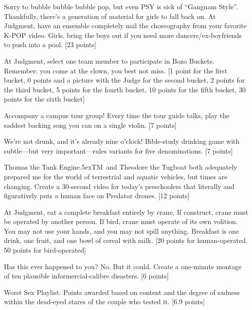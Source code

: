 \documentclass{book}
\def\tm{\raise.5ex\hbox{\scriptsize TM}}
\begin{document}
\begin{list}{}{}

\item Sorry to bubble bubble bubble pop, but even PSY is sick of ``Gangnam Style''. Thankfully, there's a generation of material for girls to fall back on. At Judgment, have an ensemble completely nail the choreography from your favorite K-POP video. Girls, bring the boys out if you need more dancers/ex-boyfriends to push into a pool. [23 points]

\item At Judgment, select one team member to participate in Bozo Buckets. Remember: you come at the clown, you best not miss. [1 point for the first bucket, 0 points and a picture with the Judge for the second bucket, 2 points for the third bucket, 5 points for the fourth bucket, 10 points for the fifth bucket, 30 points for the sixth bucket]

\item Accompany a campus tour group! Every time the tour guide talks, play the saddest backing song you can on a single violin. [7 points]

\item We're not drunk, and it's already nine o'clock! Bible-study drinking game with subtle---but very important---rules variants for five denominations. [7 points]

\item Thomas the Tank Engine\tm\ and Theodore the Tugboat both adequately prepared me for the world of terrestrial and aquatic vehicles, but times are changing. Create a 30-second video for today's preschoolers that literally and figuratively puts a human face on Predator drones. [12 points]

\item At Judgment, eat a complete breakfast entirely by crane. If construct, crane must be operated by another person. If bird, crane must operate of its own volition. You may not use your hands, and you may not spill anything. Breakfast is one drink, one fruit, and one bowl of cereal with milk. [20 points for human-operated. 50 points for bird-operated]

\item Has this ever happened to you? No. But it could. Create a one-minute montage of ten plausible informercial-calibre disasters. [6 points]

\item Worst Sex Playlist. Points awarded based on content and the degree of sadness within the dead-eyed stares of the couple who tested it. [6.9 points]


\end{list}
\end{document}
